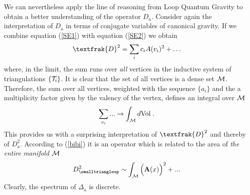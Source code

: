 \documentclass[12pt]{article}
\newcommand{\ba}{\begin{eqnarray}}
\newcommand{\ea}{\end{eqnarray}}
\def\cm{{\cal M}}
\def\ct{{\cal T}}
\begin{document}
We can nevertheless apply the line of reasoning from Loop Quantum Gravity to obtain a better understanding of the operator $D_{\smalltriangleup}$. 
Consider again the interpretation of $D_{\smalltriangleup}$ in terms of conjugate variables of canonical gravity. If we combine equation (\ref{SE1}) with equation (\ref{SE2}) we obtain
\ba 
\textfrak{D}^2 = \sum_{i} c_{i} A(v_i)^2 + \ldots
\label{bibi}
\ea
where, in the limit, the sum runs over {\it all} vertices in the inductive system of triangulations $\{\ct_i\}$. It is clear that the set of all vertices is a dense set $\cm$. Therefore, the sum over all vertices, weighted with the sequence $\{a_i\}$ and the a multiplicity factor given by the valency of the vertex, defines an integral over $\cm$
\[
\sum_{v_i}... \rightarrow \int_{\cm} d\mbox{Vol}\;.
\]
This provides us with a surprising interpretation of $\textfrak{D}^2$ and thereby of $D_{\smalltriangleup}^2$. According to (\ref{bibi}) it is an operator which is related to the area of {\it the entire manifold} $\cm$
\ba 
D_{\smalltriangleup}^2 \sim \int_\cm \Big({\bf A}(x)\Big)^2 + ...
\label{areAl}
\ea
Clearly, the spectrum of $\Delta_{\smalltriangleup}$ is discrete. 





\end{document}
